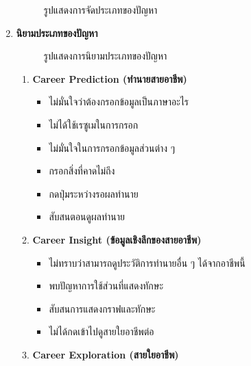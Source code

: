 \begin{enumerate}
\begin{figure}[H]
        \caption{รูปแสดงการจัดประเภทของปัญหา}\label{fig:Groping}
    \end{figure}
    \item \textbf{นิยามประเภทของปัญหา}
    \begin{figure}[H]\centering
        \caption{รูปแสดงการนิยามประเภทของปัญหา}\label{fig:CreateTheme}
    \end{figure}
    \begin{enumerate}
        \item \textbf{Career Prediction (ทำนายสายอาชีพ)}
              \begin{itemize}
                \item ไม่มั่นใจว่าต้องกรอกข้อมูลเป็นภาษาอะไร
                \item ไม่ได้ใช้เรซูเมในการกรอก
                \item ไม่มั่นใจในการกรอกข้อมูลส่วนต่าง ๆ 
                \item กรอกสิ่งที่คาดไม่ถึง
                \item กดปุ่มระหว่างรอผลทำนาย
                \item สับสนตอนดูผลทำนาย
              \end{itemize}
        \item \textbf{Career Insight (ข้อมูลเชิงลึกของสายอาชีพ)}
              \begin{itemize}
                \item ไม่ทราบว่าสามารถดูประวัติการทำนายอื่น ๆ ได้จากอาชีพนี้
                \item พบปัญหาการใช้ส่วนที่แสดงทักษะ
                \item สับสนการแสดงกราฟและทักษะ
                \item ไม่ได้กดเข้าไปดูสายใยอาชีพต่อ
              \end{itemize}
        \item \textbf{Career Exploration (สายใยอาชีพ)}

\end{enumerate}
\end{enumerate}
